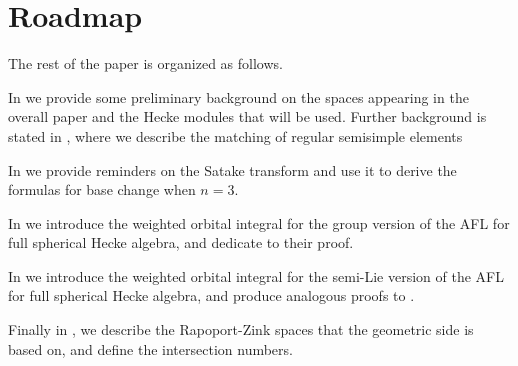 \section{Roadmap}
The rest of the paper is organized as follows.
\begin{itemize}
  \ii In  we provide some preliminary background
  on the spaces appearing in the overall paper and the Hecke modules that will be used.
  Further background is stated in ,
  where we describe the matching of regular semisimple elements

  \ii In  we provide reminders on the Satake transform
  and use it to derive the formulas for base change when $n = 3$.

  \ii In  we introduce the weighted orbital integral
  for the group version of the AFL for full spherical Hecke algebra,
  and dedicate  to their proof.

  \ii In  we introduce the weighted orbital integral
  for the semi-Lie version of the AFL for full spherical Hecke algebra,
  and produce analogous proofs to .

  \ii Finally in , we describe the Rapoport-Zink spaces
  that the geometric side is based on, and define the intersection numbers.
\end{itemize}
